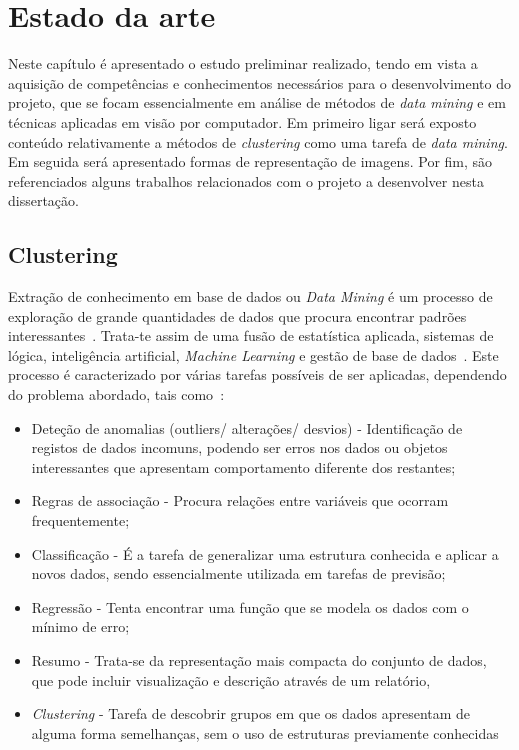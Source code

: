 \chapter{Estado da arte} \label{chap:estarte}

Neste capítulo é apresentado o estudo preliminar realizado, tendo em vista a aquisição de competências e conhecimentos necessários para o desenvolvimento do projeto, que se focam essencialmente em análise de métodos de \textit{data mining} e em técnicas aplicadas em visão por computador. Em primeiro ligar será exposto conteúdo relativamente a métodos de \textit{clustering} como uma tarefa de \textit{data mining}. Em seguida será apresentado formas de representação de imagens. Por fim, são referenciados alguns trabalhos relacionados com o projeto a desenvolver nesta dissertação.


\section{Clustering} \label{sec:cluster}

Extração de conhecimento em base de dados ou \textit{Data Mining} é um processo de exploração de grande quantidades de dados que procura encontrar padrões interessantes~\citet{Han2006}. Trata-te assim de uma fusão de estatística aplicada, sistemas de lógica, inteligência artificial, \textit{Machine Learning} e gestão de base de dados~\citet{North2012}. Este processo é caracterizado por várias tarefas possíveis de ser aplicadas, dependendo do problema abordado, tais como~\citep{Fayyad1996}:

\begin{itemize}
\item Deteção de anomalias (outliers/ alterações/ desvios) - Identificação de registos de dados incomuns, podendo ser erros nos dados ou objetos interessantes que apresentam comportamento diferente dos restantes;
\item Regras de associação - Procura relações entre variáveis que ocorram frequentemente;
\item Classificação - É a tarefa de generalizar uma estrutura conhecida e aplicar a novos dados, sendo essencialmente utilizada em tarefas de previsão;
\item Regressão - Tenta encontrar uma função que se modela os dados com o mínimo de erro;
\item Resumo - Trata-se da representação mais compacta do conjunto de dados, que pode incluir visualização e descrição através de um relatório,
\item \textit{Clustering} - Tarefa de descobrir grupos em que os dados apresentam de alguma forma semelhanças, sem o uso de estruturas previamente conhecidas
\end{itemize}


